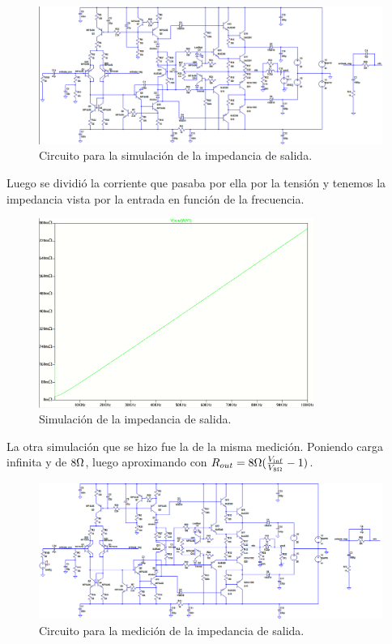 \begin{figure}[H]
\centering
\includegraphics[width=1\textwidth]{img/Rout_circ_1.png}
\caption{Circuito para la simulación de la impedancia de salida.}
\label{Rout_sim_circ}
\end{figure}

Luego se dividió la corriente que pasaba por ella por la tensión y tenemos la impedancia vista por la entrada en función de la frecuencia.

\begin{figure}[H]
\centering
\includegraphics[width=0.8\textwidth]{img/Rout_1.png}
\caption{Simulación de la impedancia de salida.}
\label{Rout_sim}
\end{figure}

La otra simulación que se hizo fue la de la misma medición. Poniendo carga infinita y de $8\ohm$, luego aproximando con $R_{out}=8\ohm(\frac{V_{\inf}}{V_{8\ohm}}-1)$.

\begin{figure}[H]
\centering
\includegraphics[width=1\textwidth]{img/Rout_circ_2.png}
\caption{Circuito para la medición de la impedancia de salida.}
\label{Rout_med_circ}
\end{figure}

